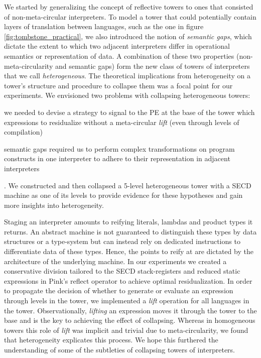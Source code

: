 \documentclass[sigplan,anonymous,review]{acmart}
\theoremstyle{definition}
\begin{document}
We started by generalizing the concept of reflective towers to ones that consisted of non-meta-circular interpreters. To model a tower that could potentially contain layers of translation between languages, such as the one in figure \ref{fig:tombstone_practical}, we also introduced the notion of \textit{semantic gaps}, which dictate the extent to which two adjacent interpreters differ in operational semantics or representation of data. A combination of these two properties (non-meta-circularity and semantic gaps) form the new class of towers of interpreters that we call \textit{heterogeneous}. The theoretical implications from heterogeneity on a tower's structure and procedure to collapse them was a focal point for our experiments. We envisioned two problems with collapsing heterogeneous towers:
\begin{enumerate*}[label=(\arabic*)]
    \item we needed to devise a strategy to signal to the PE at the base of the tower which expressions to residualize without a meta-circular \textit{lift} (even through levels of compilation)
    \item semantic gaps required us to perform complex transformations on program constructs in one interpreter to adhere to their representation in adjacent interpreters
\end{enumerate*}. We constructed and then collapsed a 5-level heterogeneous tower with a SECD machine as one of its levels to provide evidence for these hypotheses and gain more insights into heterogeneity.

Staging an interpreter amounts to reifying literals, lambdas and product types it returns. An abstract machine is not guaranteed to distinguish these types by data structures or a type-system but can instead rely on dedicated instructions to differentiate data of these types. Hence, the points to reify at are dictated by the architecture of the underlying machine. In our experiments we created a conservative division tailored to the SECD stack-registers and reduced static expressions in Pink's reflect operator to achieve optimal residualization. In order to propagate the decision of whether to generate or evaluate an expression through levels in the tower, we implemented a \textit{lift} operation for all languages in the tower. Observationally, \textit{lifting} an expression moves it through the tower to the base and is the key to achieving the effect of collapsing. Whereas in homogeneous towers this role of \textit{lift} was implicit and trivial due to meta-circularity, we found that heterogeneity explicates this process. We hope this furthered the understanding of some of the subtleties of collapsing towers of interpreters.
\end{document}
